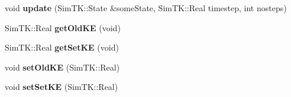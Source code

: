 \begin{DoxyCompactItemize}
\item 
void {\bfseries update} (Sim\+T\+K\+::\+State \&some\+State, Sim\+T\+K\+::\+Real timestep, int nosteps)\hypertarget{classTestHMCSOA_a5d34a0c086770191eeedf656d882747a}{}\label{classTestHMCSOA_a5d34a0c086770191eeedf656d882747a}

\item 
Sim\+T\+K\+::\+Real {\bfseries get\+Old\+KE} (void)\hypertarget{classTestHMCSOA_a1ba6e3c9a65a90aa0c1bf47bd7660d22}{}\label{classTestHMCSOA_a1ba6e3c9a65a90aa0c1bf47bd7660d22}

\item 
Sim\+T\+K\+::\+Real {\bfseries get\+Set\+KE} (void)\hypertarget{classTestHMCSOA_ae6b420395d67a508ce6ca7ed4aeedaed}{}\label{classTestHMCSOA_ae6b420395d67a508ce6ca7ed4aeedaed}

\item 
void {\bfseries set\+Old\+KE} (Sim\+T\+K\+::\+Real)\hypertarget{classTestHMCSOA_adbcd426f3dd26ee69c3ac7acd8c7b8a3}{}\label{classTestHMCSOA_adbcd426f3dd26ee69c3ac7acd8c7b8a3}

\item 
void {\bfseries set\+Set\+KE} (Sim\+T\+K\+::\+Real)\hypertarget{classTestHMCSOA_a8c2d9beb09f282513fecd22da0fc95e1}{}\label{classTestHMCSOA_a8c2d9beb09f282513fecd22da0fc95e1}

\end{DoxyCompactItemize}
